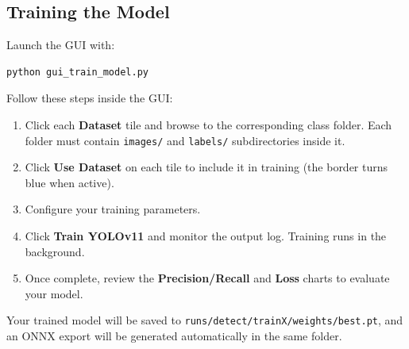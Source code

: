 \documentclass[11pt,a4paper]{article}
\begin{document}
\subsection{Training the Model}

Launch the GUI with:

\begin{lstlisting}[language=bash]
python gui_train_model.py
\end{lstlisting}

Follow these steps inside the GUI:

\begin{enumerate}
    \item Click each \textbf{Dataset} tile and browse to the corresponding class folder. Each folder must contain \texttt{images/} and \texttt{labels/} subdirectories inside it.
    \item Click \textbf{Use Dataset} on each tile to include it in training (the border turns blue when active).
    \item Configure your training parameters.
    \item Click \textbf{Train YOLOv11} and monitor the output log. Training runs in the background.
    \item Once complete, review the \textbf{Precision/Recall} and \textbf{Loss} charts to evaluate your model.
\end{enumerate}

Your trained model will be saved to \texttt{runs/detect/trainX/weights/best.pt}, and an ONNX export will be generated automatically in the same folder.
\end{document}
